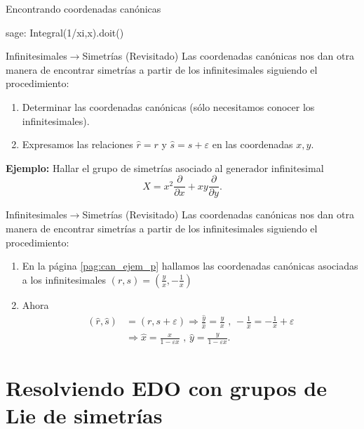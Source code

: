 \documentclass[handout,hyperref={colorlinks=true}]{beamer}
\renewcommand{\epsilon}{\varepsilon}
\newcommand{\nl}{\onslide<+-> }
\begin{document}
\begin{frame}[fragile]{Encontrando coordenadas canónicas}
 
\begin{sagecommandline}
sage: Integral(1/xi,x).doit()

\end{sagecommandline}
\end{frame}




\begin{frame}{Infinitesimales$\to$Simetrías (Revisitado)}
Las coordenadas canónicas nos dan otra manera de encontrar simetrías a partir de los infinitesimales siguiendo el procedimiento:

\begin{enumerate}
\item<+-> Determinar las coordenadas canónicas  (sólo necesitamos conocer los infinitesimales).
\item<+-> Expresamos las relaciones $\hat{r}=r$ y $\hat{s}=s+\epsilon$ en las coordenadas $x,y$.
\end{enumerate}


\textbf{Ejemplo:} Hallar el grupo de simetrías asociado al generador infinitesimal
\[X=x^2\frac{\partial}{\partial x}+xy\frac{\partial}{\partial y}.\]
\end{frame}

\begin{frame}{Infinitesimales$\to$Simetrías (Revisitado)}
\nl Las coordenadas canónicas nos dan otra manera de encontrar simetrías a partir de los infinitesimales siguiendo el procedimiento:

\begin{enumerate}
\item<+-> En la página \ref{pag:can_ejem_p} hallamos las coordenadas canónicas asociadas a los infinitesimales $(r,s)=\left(\frac{y}{x},-\frac{1}{x}\right)$
\item<+-> Ahora
\[\begin{split}
(\hat{r},\hat{s})&=(r,s+\epsilon)\Rightarrow \frac{\hat{y}}{\hat{x}}=\frac{y}{x}\text{ , }-\frac{1}{\hat{x}}=-\frac{1}{x}+\epsilon\\
&\Rightarrow \hat{x}=\frac{x}{1-\epsilon x} \text{ , } \hat{y}=\frac{y}{1-\epsilon x}.
\end{split}
\] 
\end{enumerate}

\end{frame}

\section[Resolviendo EDO]{Resolviendo EDO con grupos de Lie de simetrías}
\end{document}
